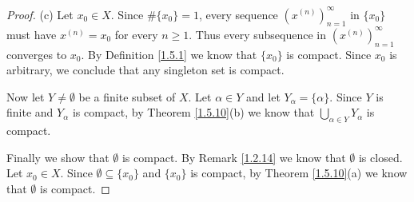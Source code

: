 \begin{proof}{(c)}
    Let \(x_0 \in X\).
    Since \(\#\{x_0\} = 1\), every sequence \((x^{(n)})_{n = 1}^\infty\) in \(\{x_0\}\) must have \(x^{(n)} = x_0\) for every \(n \geq 1\).
    Thus every subsequence in \((x^{(n)})_{n = 1}^\infty\) converges to \(x_0\).
    By Definition \ref{1.5.1} we know that \(\{x_0\}\) is compact.
    Since \(x_0\) is arbitrary, we conclude that any singleton set is compact.

    Now let \(Y \neq \emptyset\) be a finite subset of \(X\).
    Let \(\alpha \in Y\) and let \(Y_{\alpha} = \{\alpha\}\).
    Since \(Y\) is finite and \(Y_{\alpha}\) is compact, by Theorem \ref{1.5.10}(b) we know that \(\bigcup_{\alpha \in Y} Y_{\alpha}\) is compact.

    Finally we show that \(\emptyset\) is compact.
    By Remark \ref{1.2.14} we know that \(\emptyset\) is closed.
    Let \(x_0 \in X\).
    Since \(\emptyset \subseteq \{x_0\}\) and \(\{x_0\}\) is compact, by Theorem \ref{1.5.10}(a) we know that \(\emptyset\) is compact.
\end{proof}